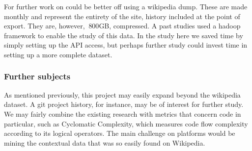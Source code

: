 For further work on could be better off using a wikipedia dump. These
are made monthly and represent the entirety of the site, history
included at the point of export. They are, however, $~800$GB,
compressed.\cite{wiki-dump} A past studies used a hadoop framework
to enable the study of this data. In the study here we saved time by
simply setting up the API access, but perhaps further study could
invest time in setting up a more complete dataset.

\subsubsection*{Further subjects}
As mentioned previously, this project may easily expand beyond the
wikipedia dataset. A git project history, for instance, may be of
interest for further study. We may fairly combine the existing
research with metrics that concern code in particular, such as
Cyclomatic Complexity, which measures code flow complexity according
to its logical operators.\cite{McCabe1976} The main challenge on
platforms would be mining the contextual data that was so easily found
on Wikipedia.
